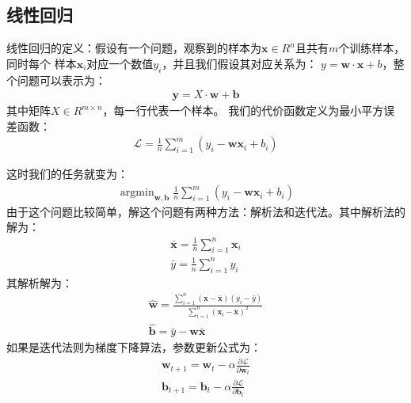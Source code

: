 \documentclass{article}
\begin{document}
\subsection{线性回归}
线性回归的定义：假设有一个问题，观察到的样本为$\boldsymbol{x} \in R^{n}$且共有$m$个训练样本，同时每个
样本$\boldsymbol{x}_{i}$对应一个数值$y_{i}$，并且我们假设其对应关系为：
$y=\boldsymbol{w} \cdot \boldsymbol{x}+b$，整个问题可以表示为：
\begin{equation}
    \begin{aligned}
        \boldsymbol{y} = X \cdot \boldsymbol{w} + \boldsymbol{b}
    \end{aligned}
    \label{e000001}
\end{equation}
其中矩阵$X \in R^{m \times n}$，每一行代表一个样本。\newline
我们的代价函数定义为最小平方误差函数：
\begin{equation}
    \begin{aligned}
        \mathcal{L}=\frac{1}{n}\sum_{i=1}^{m}(y_{i} - \boldsymbol{w} \boldsymbol{x}_{i} + b_{i})
    \end{aligned}
    \label{e000002}
\end{equation}



这时我们的任务就变为：
\begin{equation}
    \begin{aligned}
        \mathop{\arg \min}_{\boldsymbol{w}, \boldsymbol{b}} \frac{1}{n}\sum_{i=1}^{m}(y_{i} - \boldsymbol{w} \boldsymbol{x}_{i} + b_{i})
    \end{aligned}
    \label{e000003}
\end{equation}
由于这个问题比较简单，解这个问题有两种方法：解析法和迭代法。其中解析法的解为：
\begin{equation}
    \begin{aligned}
        \bar{\boldsymbol{x}}=\frac{1}{n} \sum_{i=1}^{n} \boldsymbol{x}_{i} \\
        \bar{y}=\frac{1}{n} \sum_{i=1}^{n} y_{i}
    \end{aligned}
    \label{e000004}
\end{equation}
其解析解为：
\begin{equation}
    \begin{aligned}
        \hat{\boldsymbol{w}}=\frac{\sum_{i=1}^{n}(\boldsymbol{x} - \bar{\boldsymbol{x}})(y_{i}-\bar{y})}{\sum_{i=1}^{n}(\boldsymbol{x}_{i} - \bar{\boldsymbol{x}})^{2}} \\
        \hat{\boldsymbol{b}}=\bar{y}-\boldsymbol{w} \bar{\boldsymbol{x}}
    \end{aligned}
    \label{e000005}
\end{equation}
如果是迭代法则为梯度下降算法，参数更新公式为：
\begin{equation}
    \begin{aligned}
        \boldsymbol{w}_{t+1}=\boldsymbol{w}_{t}  - \alpha \frac{\partial{\mathcal{L}}}{\partial{\boldsymbol{w}_{t}}} \\
        \boldsymbol{b}_{t+1} = \boldsymbol{b}_{t} - \alpha \frac{\partial{\mathcal{L}}}{\partial{\boldsymbol{b}_{t}}}
    \end{aligned}
    \label{e000006}
\end{equation}
\end{document}
